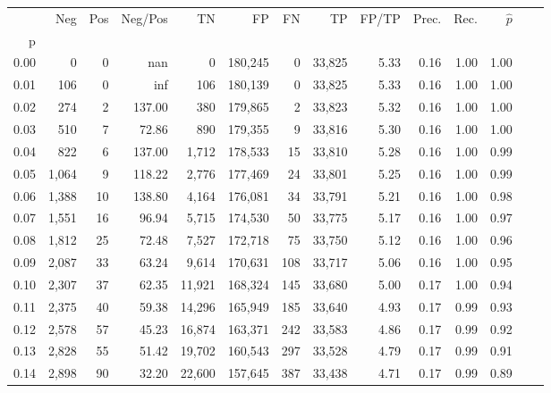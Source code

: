 \begin{tabular}{rrrrrrrrrrrrrr}
\toprule
{} &    Neg &  Pos & Neg/Pos &       TN &       FP &      FN &      TP & FP/TP & Prec. &  Rec. & $\hat{p}$ \\
p    &        &      &         &          &          &         &         &       &       &       &           \\
\midrule
0.00 &      0 &    0 &     nan &        0 &  180,245 &       0 &  33,825 &  5.33 &  0.16 &  1.00 &      1.00 \\
0.01 &    106 &    0 &     inf &      106 &  180,139 &       0 &  33,825 &  5.33 &  0.16 &  1.00 &      1.00 \\
0.02 &    274 &    2 &  137.00 &      380 &  179,865 &       2 &  33,823 &  5.32 &  0.16 &  1.00 &      1.00 \\
0.03 &    510 &    7 &   72.86 &      890 &  179,355 &       9 &  33,816 &  5.30 &  0.16 &  1.00 &      1.00 \\
0.04 &    822 &    6 &  137.00 &    1,712 &  178,533 &      15 &  33,810 &  5.28 &  0.16 &  1.00 &      0.99 \\
0.05 &  1,064 &    9 &  118.22 &    2,776 &  177,469 &      24 &  33,801 &  5.25 &  0.16 &  1.00 &      0.99 \\
0.06 &  1,388 &   10 &  138.80 &    4,164 &  176,081 &      34 &  33,791 &  5.21 &  0.16 &  1.00 &      0.98 \\
0.07 &  1,551 &   16 &   96.94 &    5,715 &  174,530 &      50 &  33,775 &  5.17 &  0.16 &  1.00 &      0.97 \\
0.08 &  1,812 &   25 &   72.48 &    7,527 &  172,718 &      75 &  33,750 &  5.12 &  0.16 &  1.00 &      0.96 \\
0.09 &  2,087 &   33 &   63.24 &    9,614 &  170,631 &     108 &  33,717 &  5.06 &  0.16 &  1.00 &      0.95 \\
0.10 &  2,307 &   37 &   62.35 &   11,921 &  168,324 &     145 &  33,680 &  5.00 &  0.17 &  1.00 &      0.94 \\
0.11 &  2,375 &   40 &   59.38 &   14,296 &  165,949 &     185 &  33,640 &  4.93 &  0.17 &  0.99 &      0.93 \\
0.12 &  2,578 &   57 &   45.23 &   16,874 &  163,371 &     242 &  33,583 &  4.86 &  0.17 &  0.99 &      0.92 \\
0.13 &  2,828 &   55 &   51.42 &   19,702 &  160,543 &     297 &  33,528 &  4.79 &  0.17 &  0.99 &      0.91 \\
0.14 &  2,898 &   90 &   32.20 &   22,600 &  157,645 &     387 &  33,438 &  4.71 &  0.17 &  0.99 &      0.89 \\

\end{tabular}
